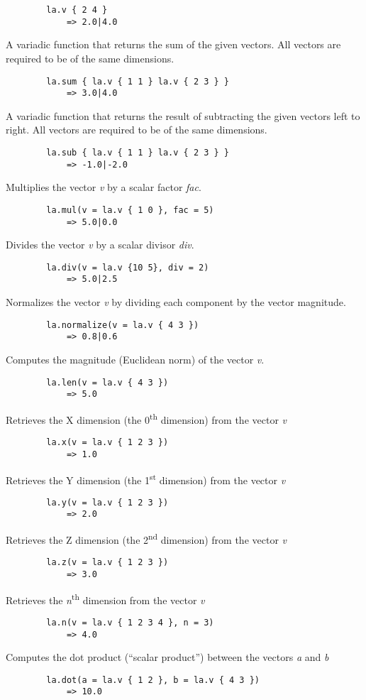 \begin{multicols*}{2}
\begin{verbatim}
		la.v { 2 4 }
		    => 2.0|4.0
	\end{verbatim}
	A variadic function that returns the sum of the given vectors.
	All vectors are required to be of the same dimensions.
	\begin{verbatim}
		la.sum { la.v { 1 1 } la.v { 2 3 } }
		    => 3.0|4.0
	\end{verbatim}
	A variadic function that returns the result of subtracting the given vectors left to right.
	All vectors are required to be of the same dimensions.
	\begin{verbatim}
		la.sub { la.v { 1 1 } la.v { 2 3 } }
		    => -1.0|-2.0
	\end{verbatim}
	Multiplies the vector \textit{v} by a scalar factor \textit{fac}.
	\begin{verbatim}
		la.mul(v = la.v { 1 0 }, fac = 5)
		    => 5.0|0.0
	\end{verbatim}
	Divides the vector \textit{v} by a scalar divisor \textit{div}.
	\begin{verbatim}
		la.div(v = la.v {10 5}, div = 2)
		    => 5.0|2.5
	\end{verbatim}
	\columnbreak
	Normalizes the vector \textit{v} by dividing each component by the vector magnitude.
	\begin{verbatim}
		la.normalize(v = la.v { 4 3 })
		    => 0.8|0.6
	\end{verbatim}
	Computes the magnitude (Euclidean norm) of the vector \textit{v}.
	\begin{verbatim}
		la.len(v = la.v { 4 3 })
		    => 5.0
	\end{verbatim}
	Retrieves the X dimension (the 0\textsuperscript{th} dimension) from the vector \textit{v}
	\begin{verbatim}
		la.x(v = la.v { 1 2 3 })
		    => 1.0
	\end{verbatim}
	Retrieves the Y dimension (the 1\textsuperscript{st} dimension) from the vector \textit{v}
	\begin{verbatim}
		la.y(v = la.v { 1 2 3 })
		    => 2.0
	\end{verbatim}
	Retrieves the Z dimension (the 2\textsuperscript{nd} dimension) from the vector \textit{v}
	\begin{verbatim}
		la.z(v = la.v { 1 2 3 })
		    => 3.0
	\end{verbatim}
	Retrieves the \textit{n}\textsuperscript{th} dimension from the vector \textit{v}
	\begin{verbatim}
		la.n(v = la.v { 1 2 3 4 }, n = 3)
		    => 4.0
	\end{verbatim}
	Computes the dot product (``scalar product'') between the vectors \textit{a} and \textit{b}
	\begin{verbatim}
		la.dot(a = la.v { 1 2 }, b = la.v { 4 3 })
		    => 10.0
	\end{verbatim}
\end{multicols*}